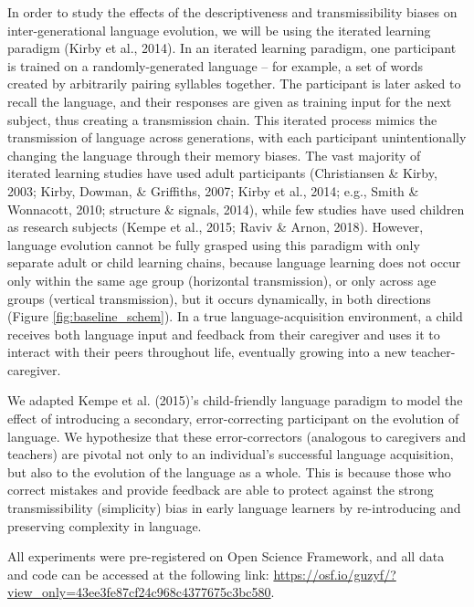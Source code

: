 \documentclass[10pt, letterpaper]{article}
\begin{document}
In order to study the effects of the descriptiveness and
transmissibility biases on inter-generational language evolution, we
will be using the iterated learning paradigm (Kirby et al., 2014). In an
iterated learning paradigm, one participant is trained on a
randomly-generated language -- for example, a set of words created by
arbitrarily pairing syllables together. The participant is later asked
to recall the language, and their responses are given as training input
for the next subject, thus creating a transmission chain. This iterated
process mimics the transmission of language across generations, with
each participant unintentionally changing the language through their
memory biases. The vast majority of iterated learning studies have used
adult participants (Christiansen \& Kirby, 2003; Kirby, Dowman, \&
Griffiths, 2007; Kirby et al., 2014; e.g., Smith \& Wonnacott, 2010;
structure \& signals, 2014), while few studies have used children as
research subjects (Kempe et al., 2015; Raviv \& Arnon, 2018). However,
language evolution cannot be fully grasped using this paradigm with only
separate adult or child learning chains, because language learning does
not occur only within the same age group (horizontal transmission), or
only across age groups (vertical transmission), but it occurs
dynamically, in both directions (Figure \ref{fig:baseline_schem}). In a
true language-acquisition environment, a child receives both language
input and feedback from their caregiver and uses it to interact with
their peers throughout life, eventually growing into a new
teacher-caregiver.

We adapted Kempe et al. (2015)'s child-friendly language paradigm to
model the effect of introducing a secondary, error-correcting
participant on the evolution of language. We hypothesize that these
error-correctors (analogous to caregivers and teachers) are pivotal not
only to an individual's successful language acquisition, but also to the
evolution of the language as a whole. This is because those who correct
mistakes and provide feedback are able to protect against the strong
transmissibility (simplicity) bias in early language learners by
re-introducing and preserving complexity in language.

All experiments were pre-registered on Open Science Framework, and all
data and code can be accessed at the following link:
\url{https://osf.io/guzyf/?view_only=43ee3fe87cf24c968c4377675c3bc580}.
\end{document}
